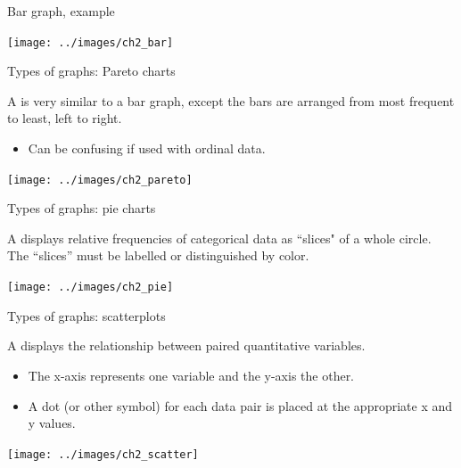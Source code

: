 \documentclass[xcolor=table, handout]{beamer}
\begin{document}
\begin{frame}{Bar graph, example}
\bigskip
{\centering
\texttt{[image: ../images/ch2\_bar]}
\par}

\end{frame}

\begin{frame}{Types of graphs: Pareto charts}

\begin{block}{}
A  is very similar to a bar graph, except the bars are arranged from most frequent to least, left to right.
\begin{itemize}
\item Can be confusing if used with ordinal data.
\end{itemize} 
\end{block}

\bigskip
{\centering
\texttt{[image: ../images/ch2\_pareto]}
\par}

\end{frame}

\begin{frame}{Types of graphs: pie charts}

\begin{block}{}
A  displays relative frequencies of categorical data as ``slices" of a whole circle. The ``slices'' must be labelled or distinguished by color.
\end{block}

\bigskip
{\centering
\texttt{[image: ../images/ch2\_pie]}
\par}

\end{frame}

\begin{frame}{Types of graphs: scatterplots}
\begin{block}{}
A  displays the relationship between paired quantitative variables.
\begin{itemize}
\item The x-axis represents one variable and the y-axis the other.
\item A dot (or other symbol) for each data pair is placed at the appropriate x and y values.
\end{itemize} 
\end{block}

\bigskip
{\centering
\texttt{[image: ../images/ch2\_scatter]}
\par}

\end{frame}
\end{document}
